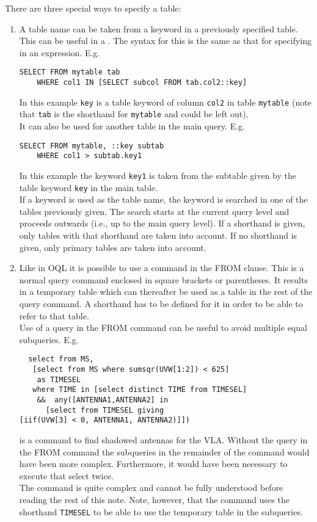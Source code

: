 There are three special ways to specify a table:
\begin{enumerate}

\item
A table name can be taken from a keyword in a previously
specified table. This can be useful in a
. The syntax for this is
the same as that for specifying 
in an expression. E.g.
\begin{verbatim}
SELECT FROM mytable tab
    WHERE col1 IN [SELECT subcol FROM tab.col2::key]
\end{verbatim}
In this example \texttt{key} is a table keyword of column
\texttt{col2} in table \texttt{mytable} (note that \texttt{tab}
is the shorthand for \texttt{mytable} and could be left out).
\\It can also be used for another table in the main query. E.g.
\begin{verbatim}
SELECT FROM mytable, ::key subtab
    WHERE col1 > subtab.key1
\end{verbatim}
In this example the keyword \texttt{key1} is taken from the
subtable given by the table keyword \texttt{key} in the main
table.
\\If a keyword is used as the table name, the keyword is
searched
in one of the tables previously given. The search starts at
the current query level and proceeds outwards (i.e., up to the
main query level). If a shorthand is given, only tables with
that shorthand are taken into account. If no shorthand is
given, only primary tables are taken into account.

\item
Like in OQL it is possible to use a
command in the FROM clause. This is a normal query command
enclosed in square brackets or parentheses.
It results in a temporary table
which can thereafter be used as a table in the rest of the
query command. A shorthand has to be defined for it in order
to be able to refer to that table.
\\Use of a query in the FROM command can be useful to avoid
multiple equal subqueries. E.g.
\begin{verbatim}
  select from MS,
   [select from MS where sumsqr(UVW[1:2]) < 625]
    as TIMESEL
   where TIME in [select distinct TIME from TIMESEL]
    &&  any([ANTENNA1,ANTENNA2] in
      [select from TIMESEL giving
[iif(UVW[3] < 0, ANTENNA1, ANTENNA2)]])
\end{verbatim}
is a command to find shadowed antennas for the VLA.
Without the query in the FROM command the subqueries in the
remainder of the command would have been more complex.
Furthermore, it would have been necessary to execute that
select twice.
\\The command is quite complex and cannot be fully understood
before reading the rest of this note.
Note, however, that the command uses the shorthand \texttt{TIMESEL}
to be able to use the temporary table in the subqueries.


\end{enumerate}
